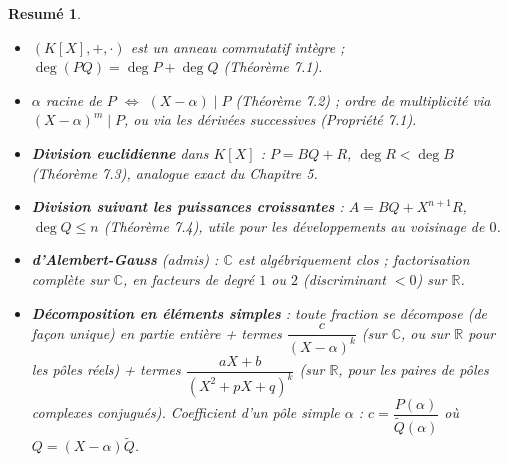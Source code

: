 \documentclass[a4paper,12pt,openany]{book}
\newtheorem{resume}{Resumé}[section]
\begin{document}
\begin{resume}
\begin{itemize}
  \item $(K[X],+,\cdot)$ est un anneau commutatif intègre ;
  $\deg(PQ)=\deg P+\deg Q$ (Théorème 7.1).
  \item $\alpha$ racine de $P$ $\iff$ $(X-\alpha)\mid P$ (Théorème 7.2) ;
  ordre de multiplicité via $(X-\alpha)^m \mid P$, ou via les dérivées
  successives (Propriété 7.1).
  \item \textbf{Division euclidienne} dans $K[X]$ : $P=BQ+R$,
  $\deg R<\deg B$ (Théorème 7.3), analogue exact du Chapitre 5.
  \item \textbf{Division suivant les puissances croissantes} : $A=BQ+X^{n+1}R$,
  $\deg Q\leq n$ (Théorème 7.4), utile pour les développements au
  voisinage de $0$.
  \item \textbf{d'Alembert-Gauss} (admis) : $\mathbb{C}$ est
  algébriquement clos ; factorisation complète sur $\mathbb{C}$, en
  facteurs de degré $1$ ou $2$ (discriminant $<0$) sur $\mathbb{R}$.
  \item \textbf{Décomposition en éléments simples} : toute fraction se
  décompose (de façon unique) en partie entière + termes
  $\dfrac{c}{(X-\alpha)^k}$ (sur $\mathbb{C}$, ou sur $\mathbb{R}$ pour
  les pôles réels) + termes $\dfrac{aX+b}{(X^2+pX+q)^k}$ (sur
  $\mathbb{R}$, pour les paires de pôles complexes conjugués). Coefficient
  d'un pôle simple $\alpha$ : $c=\dfrac{P(\alpha)}{\widetilde Q(\alpha)}$
  où $Q=(X-\alpha)\widetilde Q$.
\end{itemize}
\end{resume}
\end{document}
